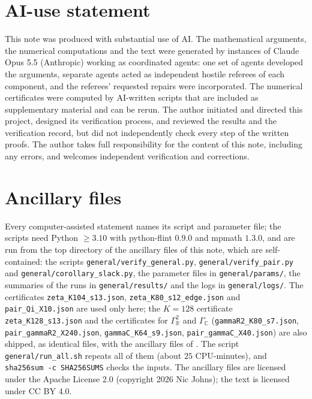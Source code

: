 \documentclass[11pt]{amsart}
\newcommand{\GR}{\Gamma_{\mathbb R}}
\newcommand{\GC}{\Gamma_{\mathbb C}}
\theoremstyle{definition}
\theoremstyle{remark}
\numberwithin{equation}{section}
\begin{document}
\section*{AI-use statement}
This note was produced with substantial use of AI. The mathematical arguments, the numerical computations and the text were generated by instances of Claude Opus 5.5
(Anthropic) working as coordinated agents: one set of agents developed the arguments, separate agents acted as
independent hostile referees of each component, and the referees' requested repairs were incorporated. The numerical
certificates were computed by AI-written scripts that are included as supplementary material and can be rerun. The
author initiated and directed this project, designed its verification process, and reviewed the results and the
verification record, but did not independently check every step of the written proofs. The author takes full
responsibility for the content of this note, including any errors, and welcomes independent verification and
corrections.

\appendix
\section{Ancillary files}\label{app:anc}

Every computer-assisted statement names its script and parameter file; the scripts need Python $\ge3.10$ with python-flint
$0.9.0$ and mpmath $1.3.0$, and are run from the top directory of the ancillary files of this note, which are
self-contained: the scripts \nolinkurl{general/verify_general.py}, \nolinkurl{general/verify_pair.py} and
\nolinkurl{general/corollary_slack.py}, the parameter files in \nolinkurl{general/params/}, the summaries of the runs in
\nolinkurl{general/results/} and the logs in \nolinkurl{general/logs/}. The certificates \nolinkurl{zeta_K104_s13.json},
\nolinkurl{zeta_K80_s12_edge.json} and \nolinkurl{pair_Qi_X10.json} are used only here; the $K=128$ certificate
\nolinkurl{zeta_K128_s13.json} and the certificates for $\GR^2$ and $\GC$ (\nolinkurl{gammaR2_K80_s7.json},
\nolinkurl{pair_gammaR2_X240.json}, \nolinkurl{gammaC_K64_s9.json}, \nolinkurl{pair_gammaC_X40.json}) are also shipped, as identical
files, with the ancillary files of \cite{PaperI}. The script \nolinkurl{general/run_all.sh} repeats all of them (about
$25$ CPU-minutes), and \texttt{sha256sum -c SHA256SUMS} checks the inputs. The ancillary files are licensed under the Apache License 2.0 (copyright 2026 Nic Johns); the text is licensed under
CC BY 4.0.



\end{document}
